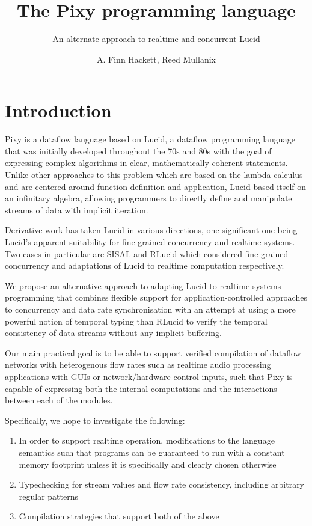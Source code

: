 \documentclass{scrartcl}
\begin{document}
    \title{The Pixy programming language}
    \subtitle{An alternate approach to realtime and concurrent Lucid}
    \author{A. Finn Hackett, Reed Mullanix}
    
    \maketitle

    \tableofcontents

    \section{Introduction}

    Pixy is a dataflow language based on Lucid, a dataflow programming language that was initially developed throughout the 70s and 80s with the goal of expressing complex algorithms in clear, mathematically coherent statements. Unlike other approaches to this problem which are based on the lambda calculus and are centered around function definition and application, Lucid based itself on an infinitary algebra, allowing programmers to directly define and manipulate streams of data with implicit iteration.

    Derivative work has taken Lucid in various directions, one significant one being Lucid's apparent suitability for fine-grained concurrency and realtime systems. Two cases in particular are SISAL and RLucid which considered fine-grained concurrency and adaptations of Lucid to realtime computation respectively.
    
    We propose an alternative approach to adapting Lucid to realtime systems programming that combines flexible support for application-controlled approaches to concurrency and data rate synchronisation with an attempt at using a more powerful notion of temporal typing than RLucid to verify the temporal consistency of data streams without any implicit buffering.
    
    Our main practical goal is to be able to support verified compilation of dataflow networks with heterogenous flow rates such as realtime audio processing applications with GUIs or network/hardware control inputs, such that Pixy is capable of expressing both the internal computations and the interactions between each of the modules.

    Specifically, we hope to investigate the following:
    \begin{enumerate}
        \item In order to support realtime operation, modifications to the language semantics such that programs can be guaranteed to run with a constant memory footprint unless it is specifically and clearly chosen otherwise
        \item Typechecking for stream values and flow rate consistency, including arbitrary regular patterns
        \item Compilation strategies that support both of the above
    \end{enumerate}
\end{document}
